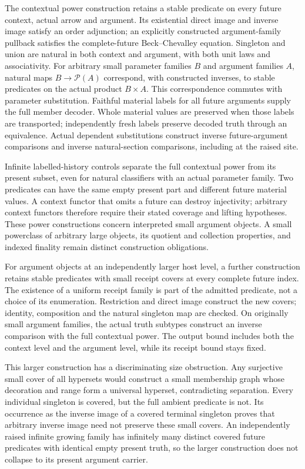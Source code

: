 \documentclass[11pt]{article}
\theoremstyle{definition}
\theoremstyle{remark}
\begin{document}
The contextual power construction retains a stable predicate on every
future context, actual arrow and argument.  Its existential direct image
and inverse image satisfy an order adjunction; an explicitly constructed
argument-family pullback satisfies the complete-future Beck--Chevalley
equation.  Singleton and union are natural in both context and argument,
with both unit laws and associativity.  For arbitrary small parameter
families $B$ and argument families $A$, natural maps
$B\to\mathcal P(A)$ correspond, with constructed inverses, to stable
predicates on the actual product $B\times A$.  This correspondence
commutes with parameter substitution.  Faithful material labels for all
future arguments supply the full member decoder.  Whole material values
are preserved when those labels are transported; independently fresh
labels preserve decoded truth through an equivalence.  Actual dependent
substitutions construct inverse future-argument comparisons and inverse
natural-section comparisons, including at the raised site.

Infinite labelled-history controls separate the full contextual power
from its present subset, even for natural classifiers with an actual
parameter family.  Two predicates can have the same empty present part
and different future material values.  A context functor that omits a
future can destroy injectivity; arbitrary context functors therefore
require their stated coverage and lifting hypotheses.  These power
constructions concern interpreted small argument objects.  A small
powerclass of arbitrary large objects, its quotient and collection
properties, and indexed finality remain distinct construction obligations.

For argument objects at an independently larger host level, a further
construction retains stable predicates with small receipt covers at every
complete future index.  The existence of a uniform receipt family is part
of the admitted predicate, not a choice of its enumeration.  Restriction
and direct image construct the new covers; identity, composition and the
natural singleton map are checked.  On originally small argument families,
the actual truth subtypes construct an inverse comparison with the full
contextual power.  The output bound includes both the context level and
the argument level, while its receipt bound stays fixed.

This larger construction has a discriminating size obstruction.  Any
surjective small cover of all hypersets would construct a small membership
graph whose decoration and range form a universal hyperset, contradicting
separation.  Every individual singleton is covered, but the full ambient
predicate is not.  Its occurrence as the inverse image of a covered
terminal singleton proves that arbitrary inverse image need not preserve
these small covers.  An independently raised infinite growing family has
infinitely many distinct covered future predicates with identical empty
present truth, so the larger construction does not collapse to its present
argument carrier.
\end{document}
